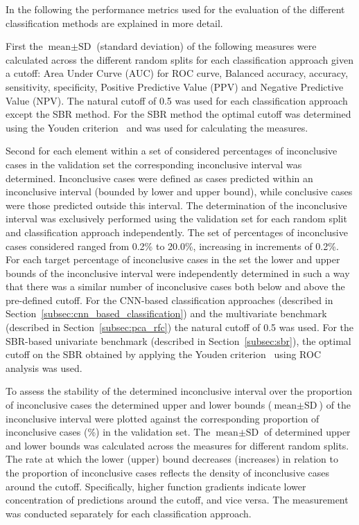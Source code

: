 In the following the performance metrics used for the evaluation of the different classification methods 
are explained in more detail.

First the $\text{mean} \pm \text{SD}$ (standard deviation) of the following measures were calculated across
the different random splits for each classification approach given a cutoff: 
Area Under Curve (AUC) for ROC curve, Balanced accuracy, accuracy, sensitivity, specificity, 
Positive Predictive Value (PPV) and Negative Predictive Value (NPV).
The natural cutoff of 0.5 was used for each classification approach except the SBR method.
For the SBR method the optimal cutoff was determined using the Youden criterion~\citep{Youden1950} and was used for
calculating the measures.

Second for each element within a set of considered percentages of inconclusive cases in the validation set 
the corresponding inconclusive interval was determined.
Inconclusive cases were defined as cases predicted within an inconclusive interval 
(bounded by lower and upper bound), while conclusive cases were those predicted outside this interval.
The determination of the inconclusive interval was exclusively performed using the validation set 
for each random split and classification approach independently.
The set of percentages of inconclusive cases considered ranged from 0.2\% to 20.0\%, increasing in increments of 0.2\%.
For each target percentage of inconclusive cases in the set the lower and upper bounds of the inconclusive interval 
were independently determined in such a way that there was a similar number of inconclusive cases both below and above 
the pre-defined cutoff.
For the CNN-based classification approaches (described in Section~\ref{subsec:cnn_based_classification}) and the 
multivariate benchmark (described in Section~\ref{subsec:pca_rfc}) the natural cutoff of 0.5 was used.
For the SBR-based univariate benchmark (described in Section~\ref{subsec:sbr}), 
the optimal cutoff on the SBR obtained by applying the Youden criterion~\citep{Youden1950} using ROC analysis was used.

To assess the stability of the determined inconclusive interval over the proportion of inconclusive cases
the determined upper and lower bounds ($\text{mean} \pm \text{SD}$) of the inconclusive interval
were plotted against the corresponding proportion of inconclusive cases (\%) in the validation set.
The $\text{mean} \pm \text{SD}$ of determined upper and lower bounds was calculated across the measures for 
different random splits.
The rate at which the lower (upper) bound decreases (increases) in relation to the proportion of inconclusive 
cases reflects the density of inconclusive cases around the cutoff.
Specifically, higher function gradients indicate lower concentration of predictions around the cutoff, 
and vice versa.
The measurement was conducted separately for each classification approach.

